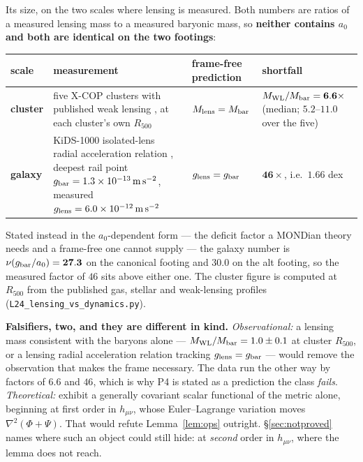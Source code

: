 \documentclass[11pt,letterpaper]{article}
\newcommand{\ms}{\,\mathrm{m\,s^{-2}}}
\begin{document}
Its size, on the two scales where lensing is measured. Both numbers are ratios of a measured lensing mass to a measured baryonic mass, so \textbf{neither contains $a_0$ and both are identical on the two footings}:
\begin{center}\small
\setlength{\tabcolsep}{4pt}\begin{tabular}{L{0.16\textwidth}L{0.30\textwidth}L{0.19\textwidth}L{0.22\textwidth}}\toprule
scale & measurement & frame-free prediction & shortfall\\\midrule
\textbf{cluster} & five X-COP clusters \cite{Eckert2019,Ettori2019} with published weak lensing \cite{Herbonnet2020}, at each cluster's own $R_{500}$ & $M_{\rm lens}=M_{\rm bar}$ & $M_{\rm WL}/M_{\rm bar}=\mathbf{6.6\times}$ (median; $5.2$--$11.0$ over the five)\\
\textbf{galaxy} & KiDS-1000 isolated-lens radial acceleration relation \cite{Brouwer2021}, deepest rail point $g_{\rm bar}=1.3\times10^{-13}\ms$, measured $g_{\rm lens}=6.0\times10^{-12}\ms$ & $g_{\rm lens}=g_{\rm bar}$ & $\mathbf{46\times}$, i.e.\ $1.66$ dex\\\bottomrule
\end{tabular}
\end{center}
Stated instead in the $a_0$-dependent form --- the deficit factor a MONDian theory needs and a frame-free one cannot supply --- the galaxy number is $\nu(g_{\rm bar}/a_0)=\mathbf{27.3}$ on the canonical footing and $\mathbf{30.0}$ on the alt footing, so the measured factor of $46$ sits above either one. The cluster figure is computed at $R_{500}$ from the published gas, stellar and weak-lensing profiles (\texttt{L24\_lensing\_vs\_dynamics.py}).

\textbf{Falsifiers, two, and they are different in kind.} \emph{Observational:} a lensing mass consistent with the baryons alone --- $M_{\rm WL}/M_{\rm bar}=1.0\pm0.1$ at cluster $R_{500}$, or a lensing radial acceleration relation tracking $g_{\rm lens}=g_{\rm bar}$ --- would remove the observation that makes the frame necessary. The data run the other way by factors of $6.6$ and $46$, which is why P4 is stated as a prediction the class \emph{fails}. \emph{Theoretical:} exhibit a generally covariant scalar functional of the metric alone, beginning at first order in $h_{\mu\nu}$, whose Euler--Lagrange variation moves $\nabla^2(\Phi+\Psi)$. That would refute Lemma~\ref{lem:ops} outright. \S\ref{sec:notproved} names where such an object could still hide: at \emph{second} order in $h_{\mu\nu}$, where the lemma does not reach.
\end{document}
